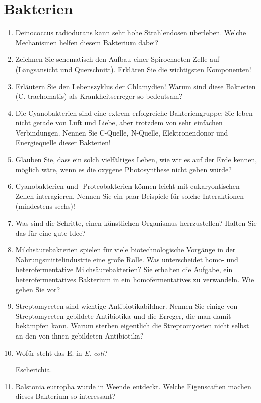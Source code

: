 \section{Bakterien}
\begin{enumerate}
	\item Deinococcus radiodurans kann sehr hohe Strahlendosen überleben. Welche Mechanismen helfen diesem Bakterium dabei?
	\item Zeichnen Sie schematisch den Aufbau einer Spirochaeten-Zelle auf (Längsansicht und Querschnitt). Erklären Sie die wichtigsten Komponenten!
	\item Erläutern Sie den Lebenszyklus der Chlamydien! Warum sind diese Bakterien (C. trachomatis) als Krankheitserreger so bedeutsam?
	\item Die Cyanobakterien sind eine extrem erfolgreiche Bakteriengruppe: Sie leben nicht gerade von Luft und Liebe, aber trotzdem von sehr einfachen Verbindungen. Nennen Sie C-Quelle, N-Quelle, Elektronendonor und Energiequelle dieser Bakterien! 
	\item Glauben Sie, dass ein solch vielfältiges Leben, wie wir es auf der Erde kennen, möglich wäre, wenn es die oxygene Photosynthese nicht geben würde?
	\item Cyanobakterien und -Proteobakterien können leicht mit eukaryontischen Zellen interagieren. Nennen Sie ein paar Beispiele für solche Interaktionen (mindestens sechs)!
	\item Was sind die Schritte, einen künstlichen Organismus herrzustellen? Halten Sie das für eine gute Idee?
	\item Milchsäurebakterien spielen für viele biotechnologische Vorgänge in der Nahrungsmittelindustrie eine große Rolle. Was unterscheidet homo- und heterofermentative Milchsäurebakterien? Sie erhalten die Aufgabe, ein heterofermentatives Bakterium in ein homofermentatives zu verwandeln. Wie gehen Sie vor?
	\item Streptomyceten sind wichtige Antibiotikabildner. Nennen Sie einige von Streptomyceten gebildete Antibiotika und die Erreger, die man damit bekämpfen kann. Warum sterben eigentlich die Streptomyceten nicht selbst an den von ihnen gebildeten Antibiotika?
	\item Wofür steht das E. in \emph{E. coli}? 

		Escherichia.

	\item Ralstonia eutropha wurde in Weende entdeckt. Welche Eigenscaften machen dieses Bakterium so interessant?
		

\end{enumerate}
